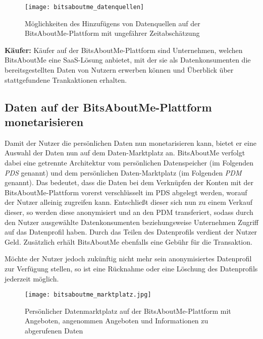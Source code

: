 \begin{figure}[!ht]
	\centering
	\texttt{[image: bitsaboutme\_datenquellen]}
	\caption{Möglichkeiten des Hinzufügens von Datenquellen auf der BitsAboutMe-Plattform mit ungefährer Zeitabschätzung}
	\label{fig:bitsaboutmeDatenquellen}
\end{figure}
\FloatBarrier

\noindent \textbf{Käufer:} Käufer auf der BitsAboutMe-Plattform sind Unternehmen, welchen BitsAboutMe eine SaaS-Lösung anbietet, mit der sie als Datenkonsumenten die bereitsgestellten Daten von Nutzern erwerben können und Überblick über stattgefundene Trankaktionen erhalten.

\subsection{Daten auf der BitsAboutMe-Plattform monetarisieren}
Damit der Nutzer die persönlichen Daten nun monetarisieren kann, bietet er eine Auswahl der Daten nun auf dem Daten-Marktplatz an. BitsAboutMe verfolgt dabei eine getrennte Architektur vom persönlichen Datenspeicher (im Folgenden \textit{PDS} genannt) und dem persönlichen Daten-Marktplatz (im Folgenden \textit{PDM} genannt). Das bedeutet, dass die Daten bei dem Verknüpfen der Konten mit der BitsAboutMe-Plattform vorerst verschlüsselt im PDS abgelegt werden, worauf der Nutzer alleinig zugreifen kann. Entschließt dieser sich nun zu einem Verkauf dieser, so werden diese anonymisiert und an den PDM transferiert, sodass durch den Nutzer ausgewählte Datenkonsumenten beziehungsweise Unternehmen Zugriff auf das Datenprofil haben. Durch das Teilen des Datenprofils verdient der Nutzer Geld. Zusätzlich erhält BitsAboutMe ebenfalls eine Gebühr für die Transaktion.\newline

\noindent Möchte der Nutzer jedoch zukünftig nicht mehr sein anonymisiertes Datenprofil zur Verfügung stellen, so ist eine Rücknahme oder eine Löschung des Datenprofils jederzeit möglich. \newline

\begin{figure}[!ht]
	\centering
	\texttt{[image: bitsaboutme\_marktplatz.jpg]}
	\caption{Persönlicher Datenmarktplatz auf der BitsAboutMe-Plattform mit Angeboten, angenommen Angeboten und Informationen zu abgerufenen Daten}
	\label{fig:bitsaboutmeMarktplatz}
\end{figure}
\FloatBarrier


